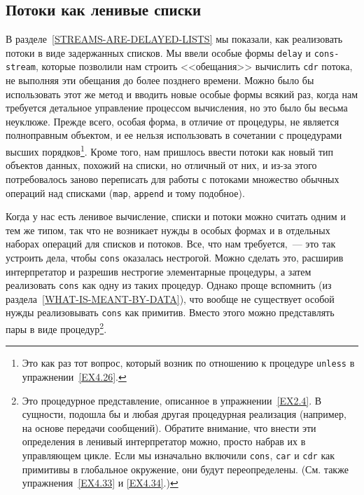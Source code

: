 \subsection{Потоки как ленивые списки}
\label{STREAMS-AS-LAZY-LISTS}%


В разделе~\ref{STREAMS-ARE-DELAYED-LISTS} мы
показали, как реализовать потоки в виде задержанных списков.  Мы ввели
особые формы {\tt delay} и {\tt cons-stream}, которые
позволили нам строить <<обещания>> вычислить {\tt cdr} потока,
не выполняя эти обещания до более позднего времени.  Можно было бы
использовать этот же метод и вводить новые особые формы всякий раз,
когда нам требуется детальное управление процессом вычисления, но
это было бы весьма неуклюже.  Прежде всего, особая форма, в
отличие от процедуры, не является полноправным объектом, и ее нельзя
использовать в сочетании с процедурами высших порядков\footnote{Это как 
раз тот вопрос, который возник по отношению к
процедуре {\tt unless} в упражнении~\ref{EX4.26}.}.
Кроме того, нам пришлось ввести потоки как новый тип объектов данных,
похожий на списки, но отличный от них, и из-за этого потребовалось
заново переписать для работы с потоками множество обычных операций над списками 
({\tt map}, {\tt append} и тому подобное).

Когда у нас есть ленивое вычисление, списки и потоки можно
считать одним и тем же типом, так что не возникает нужды в особых
формах и в отдельных наборах операций для списков и потоков.  Все, что
нам требуется,~--- это так устроить дела, чтобы {\tt cons}
оказалась нестрогой.  Можно сделать это, расширив интерпретатор и
разрешив нестрогие элементарные процедуры, а затем реализовать
{\tt cons} как одну из таких процедур.  Однако проще вспомнить
(из раздела~\ref{WHAT-IS-MEANT-BY-DATA}), что вообще не существует
особой нужды реализовывать {\tt cons} как примитив.  Вместо
этого можно представлять пары в виде процедур\footnote{Это
  процедурное представление, описанное в
упражнении~\ref{EX2.4}.  В сущности, подошла бы и любая другая
процедурная реализация (например, на основе передачи сообщений).
Обратите внимание, что внести эти определения в ленивый интерпретатор
можно, просто набрав их в управляющем цикле.  Если мы изначально
включили  {\tt cons}, {\tt car} и {\tt cdr} как
примитивы в глобальное окружение, они будут
переопределены. (См. также упражнения~\ref{EX4.33} и 
\ref{EX4.34}.)}.

